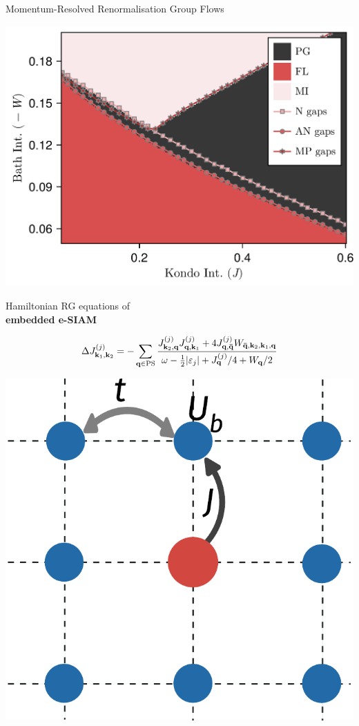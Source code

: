 \documentclass[12pt,aspectratio=169]{beamer}
\newcommand\focus[1]{%
	{\alert{\textbf{#1}}}
}
\begin{document}
\begin{frame}{Momentum-Resolved Renormalisation Group Flows}
\begin{minipage}{0.3\textwidth}
	\includegraphics[width=\textwidth]{phaseDiagram.pdf}
\end{minipage}
\hspace*{\fill}
\begin{minipage}{0.45\textwidth}
	Hamiltonian RG equations of \\
	\focus{embedded e-SIAM}
	\[\Delta J^{(j)}_{{\bf k}_1, {\bf k}_2} = -\sum_{{\bf q} \in \text{PS}} \frac{J^{(j)}_{{\bf k}_2,{\bf q}} J^{(j)}_{{\bf q},{\bf k}_1} + 4J^{(j)}_{{\bf q}, {\bf \bar q}} W_{{\bf \bar q}, {\bf k}_2, {\bf k}_1, {\bf q}}}{\omega - \frac{1}{2}|\varepsilon_j| + J^{(j)}_{{\bf q}}/4 + W_{{\bf q}}/2}\]
\end{minipage}
\hspace*{\fill}
\begin{minipage}{0.2\textwidth}
	\includegraphics[width=\textwidth]{pWaveEsiam.pdf}
\end{minipage}


\end{frame}
\end{document}
